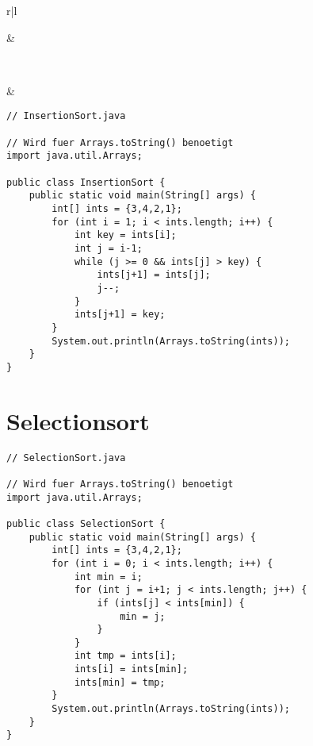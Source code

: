 \begin{center}
\begin{tabular}{r|l}
\begin{tikzpicture}
                 column 1/.style={nodes={fill=magenta!25}}]{
        2 & 3 & 4\\
    };
\end{tikzpicture} &
 \\
 & \\
\end{tabular}
\end{center}

\begin{center}
\begin{lstlisting}
// InsertionSort.java

// Wird fuer Arrays.toString() benoetigt
import java.util.Arrays;

public class InsertionSort {
    public static void main(String[] args) {
        int[] ints = {3,4,2,1};
        for (int i = 1; i < ints.length; i++) {
            int key = ints[i];
            int j = i-1;
            while (j >= 0 && ints[j] > key) {
                ints[j+1] = ints[j];
                j--;
            }
            ints[j+1] = key;
        }
        System.out.println(Arrays.toString(ints));
    }
}
\end{lstlisting}
\end{center}

\section{Selectionsort}
\begin{center}
\begin{lstlisting}
// SelectionSort.java

// Wird fuer Arrays.toString() benoetigt
import java.util.Arrays;

public class SelectionSort {
    public static void main(String[] args) {
        int[] ints = {3,4,2,1};
        for (int i = 0; i < ints.length; i++) {
            int min = i;
            for (int j = i+1; j < ints.length; j++) {
                if (ints[j] < ints[min]) {
                    min = j;
                }
            }
            int tmp = ints[i];
            ints[i] = ints[min];
            ints[min] = tmp;
        }
        System.out.println(Arrays.toString(ints));
    }
}
\end{lstlisting}
\end{center}

